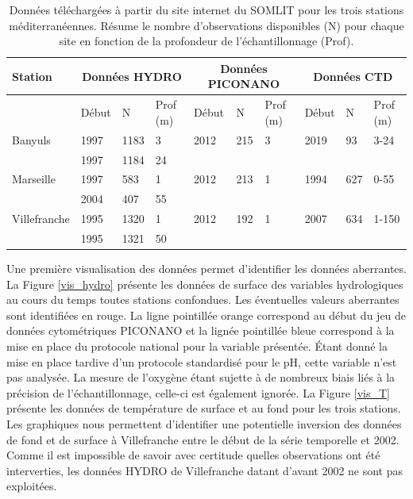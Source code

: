 \documentclass[12pt]{article}
\begin{document}
\begingroup
\renewcommand*{\arraystretch}{1.5}
\begin{table}
\caption{Données téléchargées à partir du site internet du SOMLIT pour les trois stations méditerranéennes. Résume le nombre d'observations disponibles (N) pour chaque site en fonction de la profondeur de l'échantillonnage (Prof).}
\label{data_table}
\begin{tabularx}{\textwidth}{X l l X l l X l l l}
\hline
Station & \multicolumn{3}{c}{Données HYDRO} & \multicolumn{3}{c}{Données PICONANO} & \multicolumn{3}{c}{Données CTD} \\
\hline
 & Début & N & Prof (m) & Début & N & Prof (m) & Début & N & Prof (m)\\
\hline
Banyuls &1997 & 1183 & 3  & 2012 & 215 & 3 & 2019 & 93 & 3-24\\
& 1997 & 1184 & 24 & & & & \\
Marseille &1997 & 583 & 1 & 2012 & 213 & 1 & 1994 & 627 & 0-55\\
& 2004 & 407 & 55 & & & & \\
Villefranche  & 1995 & 1320 & 1 & 2012 & 192 & 1 & 2007 & 634 & 1-150\\
& 1995 & 1321 & 50 & & & & \\
\hline
\end{tabularx}
\end{table}
\endgroup

Une première visualisation des données permet d’identifier %
les données aberrantes. La Figure \ref{vis_hydro} présente les données de surface des variables hydrologiques au cours du temps toutes stations confondues. Les éventuelles valeurs aberrantes sont identifiées en rouge. La ligne pointillée orange correspond au début du jeu de données cytométriques PICONANO et la lignée pointillée bleue correspond à la mise en place du protocole national pour la variable présentée. Étant donné la mise en place tardive d’un protocole standardisé pour le pH, cette variable n’est pas analysée. La mesure de l’oxygène étant sujette à de nombreux biais liés à la précision de l’échantillonnage, celle-ci est également ignorée. La Figure \ref{vis_T} présente les données de température de surface et au fond pour les trois stations. Les graphiques nous permettent d’identifier une potentielle inversion des données de fond et de surface à Villefranche entre le début de la série temporelle et 2002. Comme il est impossible de savoir avec certitude quelles observations ont été interverties, les données HYDRO de Villefranche datant d’avant  2002 ne sont pas exploitées. 
\end{document}
